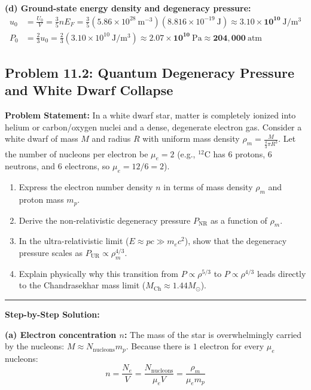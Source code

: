 \documentclass[11pt,a4paper]{article}
\begin{document}
\textbf{(d) Ground-state energy density and degeneracy pressure:}
\begin{align*}
u_0 &= \frac{U_0}{V} = \frac{3}{5}n E_F = \frac{3}{5}(5.86 \times 10^{28}\ \mathrm{m^{-3}})(8.816 \times 10^{-19}\ \mathrm{J}) \approx \mathbf{3.10 \times 10^{10}\ \mathrm{J/m^3}} \\
P_0 &= \frac{2}{3}u_0 = \frac{2}{3}(3.10 \times 10^{10}\ \mathrm{J/m^3}) \approx \mathbf{2.07 \times 10^{10}\ \mathrm{Pa}} \approx \mathbf{204{,}000\ \mathrm{atm}}
\end{align*}

\vspace{0.4cm}

\subsection{Problem 11.2: Quantum Degeneracy Pressure and White Dwarf Collapse}
\textbf{Problem Statement:}
In a white dwarf star, matter is completely ionized into helium or carbon/oxygen nuclei and a dense, degenerate electron gas. Consider a white dwarf of mass $M$ and radius $R$ with uniform mass density $\rho_m = \frac{M}{\frac{4}{3}\pi R^3}$. Let the number of nucleons per electron be $\mu_e = 2$ (e.g., $^{12}\mathrm{C}$ has $6$ protons, $6$ neutrons, and $6$ electrons, so $\mu_e = 12/6 = 2$).
\begin{enumerate}[label=(\alph*)]
    \item Express the electron number density $n$ in terms of mass density $\rho_m$ and proton mass $m_p$.
    \item Derive the non-relativistic degeneracy pressure $P_{\mathrm{NR}}$ as a function of $\rho_m$.
    \item In the ultra-relativistic limit ($E \approx p c \gg m_e c^2$), show that the degeneracy pressure scales as $P_{\mathrm{UR}} \propto \rho_m^{4/3}$.
    \item Explain physically why this transition from $P \propto \rho^{5/3}$ to $P \propto \rho^{4/3}$ leads directly to the Chandrasekhar mass limit ($M_{\mathrm{Ch}} \approx 1.44 M_\odot$).
\end{enumerate}

\vspace{0.2cm}\hrule\vspace{0.2cm}
\textbf{Step-by-Step Solution:}

\textbf{(a) Electron concentration $n$:}
The mass of the star is overwhelmingly carried by the nucleons: $M \approx N_{\mathrm{nucleons}} m_p$. Because there is $1$ electron for every $\mu_e$ nucleons:
\[
n = \frac{N_e}{V} = \frac{N_{\mathrm{nucleons}}}{\mu_e V} = \frac{\rho_m}{\mu_e m_p}
\]
\end{document}

